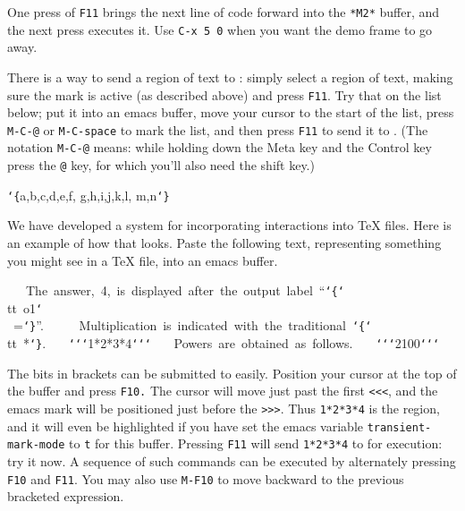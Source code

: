 One press of {\tt {}F11} brings the next line of code forward into the
{\tt {}*M2*} buffer, and the next press executes it.  Use {\tt {}C-x\ 5\ 0} 
when you want the demo frame to go away.

There is a way to send a region of text to \Mtwo: simply select a region
of text, making sure the mark is active (as described above) and press {\tt {}F11}.
Try that on the list below; put it into an emacs buffer, move your cursor to the 
start of the list, press {\tt {}M-C-@} or {\tt {}M-C-space} to mark the list, 
and then press {\tt {}F11} to send it to \Mtwo.  (The notation {\tt {}M-C-@} 
means: while holding down the Meta key and the Control key press the {\tt {}@} key, 
for which you'll also need the shift key.)

\smallskip

{\ttfamily\obeylines
{\tt\char`\{}a,b,c,d,e,f,
g,h,i,j,k,l,
m,n{\tt\char`\}}
}

\smallskip

We have developed a system for incorporating \Mtwo interactions into TeX
files.  Here is an example of how that looks.  Paste the following text,
representing something you might see in a TeX file, into an emacs buffer.

\medskip

{\ttfamily\obeylines\scriptsize
~~~The~answer,~4,~is~displayed~after~the~output~label~``{\tt\char`\{}{\tt\char`\\}tt~o1{\tt\char`\\}~={\tt\char`\}}''.~~
~~~Multiplication~is~indicated~with~the~traditional~{\tt\char`\{}{\tt\char`\\}tt~*{\tt\char`\}}.
~~~{\tt \char`\<}{\tt\char`\<}{\tt\char`\<}1*2*3*4{\tt\char`\>}{\tt\char`\>}{\tt\char`\>}
~~~Powers~are~obtained~as~follows.
~~~{\tt\char`\<}{\tt\char`\<}{\tt\char`\<}2{}100{\tt\char`\>}{\tt\char`\>}{\tt\char`\>}
}

\smallskip

The bits in brackets can be submitted to \Mtwo easily.  Position your
cursor at the top of the buffer and press {\tt {}F10.}  The cursor will move 
just past the first {\tt {<}<<}, and the emacs mark will be positioned just 
before the {\tt {}>>>}.  Thus {\tt {}1*2*3*4} is the region, and it will
even be highlighted if you have set the emacs variable {\tt {}transient-mark-mode}
to {\tt {}t} for this buffer.  Pressing {\tt {}F11} will send {\tt {}1*2*3*4} 
to \Mtwo for execution: try it now.  A sequence of such \Mtwo commands 
can be executed by alternately pressing {\tt {}F10} and {\tt {}F11}.  You may
also use {\tt {}M-F10} to move backward to the previous bracketed expression.

